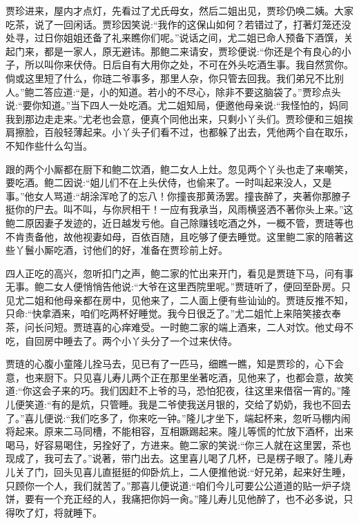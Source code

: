 \begin{parag}
    贾珍进来，屋内才点灯，先看过了尤氏母女，然后二姐出见，贾珍仍唤二姨。大家吃茶，说了一回闲话。贾珍因笑说:“我作的这保山如何？若错过了，打著灯笼还没处寻，过日你姐姐还备了礼来瞧你们呢。”说话之间，尤二姐已命人预备下酒馔，关起门来，都是一家人，原无避讳。那鲍二来请安，贾珍便说:“你还是个有良心的小子，所以叫你来伏侍。日后自有大用你之处，不可在外头吃酒生事。我自然赏你。倘或这里短了什么，你琏二爷事多，那里人杂，你只管去回我。我们弟兄不比别人。”鲍二答应道:“是，小的知道。若小的不尽心，除非不要这脑袋了。”贾珍点头说:“要你知道。”当下四人一处吃酒。尤二姐知局，便邀他母亲说:“我怪怕的，妈同我到那边走走来。”尤老也会意，便真个同他出来，只剩小丫头们。贾珍便和三姐挨肩擦脸，百般轻薄起来。小丫头子们看不过，也都躲了出去，凭他两个自在取乐，不知作些什么勾当。
\end{parag}


\begin{parag}
    跟的两个小厮都在厨下和鲍二饮酒，鲍二女人上灶。忽见两个丫头也走了来嘲笑，要吃酒。鲍二因说:“姐儿们不在上头伏侍，也偷来了。一时叫起来没人，又是事。”他女人骂道:“胡涂浑呛了的忘八！你撞丧那黄汤罢。撞丧醉了，夹著你那膫子挺你的尸去。叫不叫，与你屄相干！一应有我承当，风雨横竖洒不著你头上来。”这鲍二原因妻子发迹的，近日越发亏他。自己除赚钱吃酒之外，一概不管，贾琏等也不肯责备他，故他视妻如母，百依百随，且吃够了便去睡觉。这里鲍二家的陪著这些丫鬟小厮吃酒，讨他们的好，准备在贾珍前上好。
\end{parag}


\begin{parag}
    四人正吃的高兴，忽听扣门之声，鲍二家的忙出来开门，看见是贾琏下马，问有事无事。鲍二女人便悄悄告他说:“大爷在这里西院里呢。”贾琏听了，便回至卧房。只见尤二姐和他母亲都在房中，见他来了，二人面上便有些讪讪的。贾琏反推不知，只命:“快拿酒来，咱们吃两杯好睡觉。我今日很乏了。”尤二姐忙上来陪笑接衣奉茶，问长问短。贾琏喜的心痒难受。一时鲍二家的端上酒来，二人对饮。他丈母不吃，自回房中睡去了。两个小丫头分了一个过来伏侍。
\end{parag}


\begin{parag}
    贾琏的心腹小童隆儿拴马去，见已有了一匹马，细瞧一瞧，知是贾珍的，心下会意，也来厨下。只见喜儿寿儿两个正在那里坐著吃酒，见他来了，也都会意，故笑道:“你这会子来的巧。我们因赶不上爷的马，恐怕犯夜，往这里来借宿一宵的。”隆儿便笑道:“有的是炕，只管睡。我是二爷使我送月银的，交给了奶奶，我也不回去了。”喜儿便说:“我们吃多了，你来吃一钟。”隆儿才坐下，端起杯来，忽听马棚内闹将起来。原来二马同槽，不能相容，互相蹶踢起来。隆儿等慌的忙放下酒杯，出来喝马，好容易喝住，另拴好了，方进来。鲍二家的笑说:“你三人就在这里罢，茶也现成了，我可去了。”说著，带门出去。这里喜儿喝了几杯，已是楞子眼了。隆儿寿儿关了门，回头见喜儿直挺挺的仰卧炕上，二人便推他说:“好兄弟，起来好生睡，只顾你一个人，我们就苦了。”那喜儿便说道:“咱们今儿可要公公道道的贴一炉子烧饼，要有一个充正经的人，我痛把你妈一肏。”隆儿寿儿见他醉了，也不必多说，只得吹了灯，将就睡下。
\end{parag}


